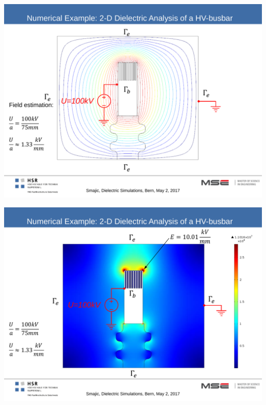 \begin{minipage}{7cm}
	\includegraphics[width=.8\textwidth]{./images/Lines.pdf}
\end{minipage}
\begin{minipage}{7.5cm}
	\includegraphics[width=.8\textwidth]{./images/Field.pdf}
\end{minipage}
